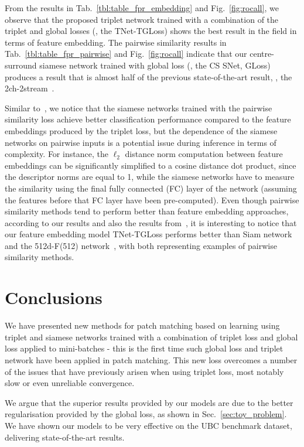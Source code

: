 \documentclass[10pt,twocolumn,letterpaper]{article}
\begin{document}
From the results in Tab.~\ref{tbl:table_fpr_embedding} and Fig.~\ref{fig:rocall}, we observe that the proposed triplet network trained with a combination of the triplet and global losses (\ie, the {TNet-TGLoss}) shows the best result in the field in terms of feature embedding.  The pairwise similarity results in Tab.~\ref{tbl:table_fpr_pairwise}  and Fig.~\ref{fig:rocall} indicate that our centre-surround siamese network trained with global loss (\ie, the {CS SNet, GLoss}) produces a result that is almost half of the previous state-of-the-art result, \ie, the 2ch-2stream~\cite{ZagoruykoCVPR15}.


Similar to~\cite{ZagoruykoCVPR15}, we notice that the siamese networks trained with the pairwise similarity loss achieve better classification performance compared to the feature embeddings produced by the triplet loss, but the dependence of the siamese networks on pairwise inputs is a potential issue during inference in terms of complexity.  For instance, the $\ell_2$ distance norm computation between feature embeddings can be significantly simplified to a cosine distance dot product, since the descriptor norms are equal to 1, while the siamese networks have to measure the similarity using the final fully connected (FC) layer of the network (assuming the features before that FC layer have been pre-computed).
Even though pairwise similarity methods tend to perform better than feature embedding approaches, according to our results and also the results from~\cite{ZagoruykoCVPR15}, it is interesting to notice that our feature embedding model {TNet-TGLoss} performs better than Siam network~\cite{ZagoruykoCVPR15} and the 512d-F(512) network~\cite{Han_cvpr15}, with both representing examples of pairwise similarity methods.


\section{Conclusions}


We have presented new methods for patch matching based on learning using triplet and siamese networks trained with a combination of triplet loss and global loss applied to mini-batches - this is the first time such global loss and triplet network have been applied in patch matching. This new loss overcomes a number of the issues that have previously arisen when using triplet loss, most notably slow or even unreliable convergence.

We argue that the superior results provided by our models are due to the better regularisation provided by the global loss, as shown in Sec.~\ref{sec:toy_problem}.  We have shown our models to
be very effective on the UBC benchmark dataset, delivering state-of-the-art results.
\end{document}
